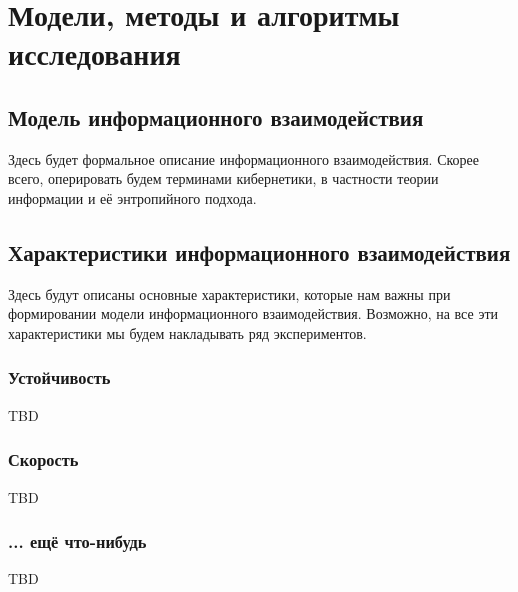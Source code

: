 \section{Модели, методы и алгоритмы исследования}

\subsection{Модель информационного взаимодействия}

Здесь будет формальное описание информационного взаимодействия.
Скорее всего, оперировать будем терминами кибернетики, в частности теории информации и её энтропийного подхода.

\subsection{Характеристики информационного взаимодействия}

Здесь будут описаны основные характеристики, которые нам важны при формировании модели информационного взаимодействия.
Возможно, на все эти характеристики мы будем накладывать ряд экспериментов.

\subsubsection{Устойчивость}

TBD

\subsubsection{Скорость}

TBD

\subsubsection{... ещё что-нибудь}

TBD

\clearpage
\newpage